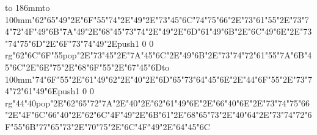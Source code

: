 \hbox to 186mm{\hsize=81mm\vbox to 100mm{\vfill\ipa\char"62\ipa\char"65\ipa\char"49\ipa\char"2E\ipa\char"6F\ipa\char"55\ipa\char"74\ipa\char"2E\ipa\char"49\ipa\char"2E\ipa\char"73\ipa\char"45\ipa\char"6C\medskip\ipa\char"74\ipa\char"75\ipa\char"66\ipa\char"2E\ipa\char"73\ipa\char"61\ipa\char"55\ipa\char"2E\ipa\char"73\ipa\char"74\ipa\char"72\ipa\char"4F\ipa\char"49\ipa\char"6B\medskip\ipa\char"7A\ipa\char"49\ipa\char"2E\ipa\char"68\ipa\char"45\ipa\char"73\ipa\char"74\ipa\char"2E\ipa\char"49\ipa\char"2E\ipa\char"6D\ipa\char"61\ipa\char"49\ipa\char"6B\ipa\char"2E\ipa\char"6C\ipa\char"49\ipa\char"6E\ipa\char"2E\ipa\char"73\ipa\char"74\ipa\char"75\ipa\char"6D\ipa\char"2E\ipa\char"6F\ipa\char"73\ipa\char"74\medskip\ipa\char"49\ipa\char"2E\pdfcolorstack\match push{1 0 0 rg}\ipa\char"62\ipa\char"6C\ipa\char"6F\ipa\char"55\pdfcolorstack\match pop{}\ipa\char"2E\ipa\char"73\ipa\char"45\ipa\char"2E\ipa\char"7A\ipa\char"45\ipa\char"6C\ipa\char"2E\ipa\char"49\ipa\char"6B\ipa\char"2E\ipa\char"73\ipa\char"74\ipa\char"72\ipa\char"61\ipa\char"55\ipa\char"7A\medskip\ipa\char"6B\ipa\char"45\ipa\char"6C\ipa\char"2E\ipa\char"6E\ipa\char"75\ipa\char"2E\ipa\char"68\ipa\char"6F\ipa\char"55\ipa\char"2E\ipa\char"67\ipa\char"45\ipa\char"6D\vfill}\hfill\vbox to 100mm{\vfill\ipa\char"74\ipa\char"6F\ipa\char"55\ipa\char"2E\ipa\char"61\ipa\char"49\ipa\char"62\ipa\char"2E\ipa\char"40\ipa\char"2E\ipa\char"6D\ipa\char"65\ipa\char"73\medskip\ipa\char"64\ipa\char"45\ipa\char"6E\ipa\char"2E\ipa\char"44\ipa\char"6F\ipa\char"55\ipa\char"2E\ipa\char"73\ipa\char"74\ipa\char"72\ipa\char"61\ipa\char"49\ipa\char"6E\medskip\pdfcolorstack\match push{1 0 0 rg}\ipa\char"44\ipa\char"40\pdfcolorstack\match pop{}\ipa\char"2E\ipa\char"62\ipa\char"65\ipa\char"72\ipa\char"7A\ipa\char"2E\ipa\char"40\ipa\char"2E\ipa\char"62\ipa\char"61\ipa\char"49\ipa\char"6E\ipa\char"2E\ipa\char"66\ipa\char"40\ipa\char"6E\ipa\char"2E\ipa\char"73\ipa\char"74\ipa\char"75\ipa\char"66\ipa\char"2E\ipa\char"4F\ipa\char"6C\ipa\char"66\medskip\ipa\char"40\ipa\char"2E\ipa\char"62\ipa\char"6C\ipa\char"4F\ipa\char"49\ipa\char"2E\ipa\char"6B\ipa\char"61\ipa\char"2E\ipa\char"68\ipa\char"65\ipa\char"73\ipa\char"2E\ipa\char"40\ipa\char"64\ipa\char"2E\ipa\char"73\ipa\char"74\ipa\char"72\ipa\char"6F\ipa\char"55\ipa\char"6B\medskip\ipa\char"77\ipa\char"65\ipa\char"73\ipa\char"2E\ipa\char"70\ipa\char"75\ipa\char"2E\ipa\char"6C\ipa\char"4F\ipa\char"49\ipa\char"2E\ipa\char"64\ipa\char"45\ipa\char"6C\vfill}}\eject
